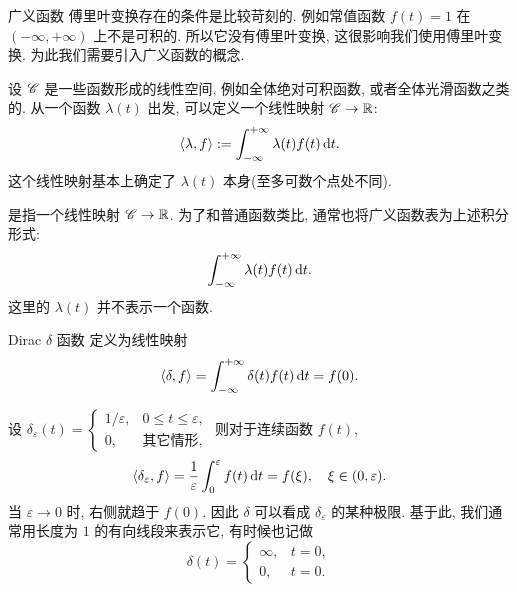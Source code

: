\begin{frame}{广义函数}
\onslide<+->
傅里叶变换存在的条件是比较苛刻的.
\onslide<+->
例如常值函数 $f(t)=1$ 在 $(-\infty,+\infty)$ 上不是可积的. 所以它没有傅里叶变换, 这很影响我们使用傅里叶变换.
\onslide<+->
为此我们需要引入广义函数的概念.

\onslide<+->
设 $\mathscr{C}$ 是一些函数形成的线性空间, 例如全体绝对可积函数, 或者全体光滑函数之类的. 
\onslide<+->
从一个函数 $\lambda(t)$ 出发, 可以定义一个线性映射 $\mathscr{C}\to {\mathbb{R}}$:
\[\langle{\lambda,f}\rangle:=\int_{-\infty}^{+\infty}\lambda(t)f(t)\,\mathrm{d} t.\]
\onslide<+->
这个线性映射基本上确定了 $\lambda(t)$ 本身(至多可数个点处不同).

\onslide<+->
是指一个线性映射 $\mathscr{C}\to {\mathbb{R}}$.
\onslide<+->
为了和普通函数类比, 通常也将广义函数表为上述积分形式:
\[\int_{-\infty}^{+\infty}\lambda(t)f(t)\,\mathrm{d} t.\]
这里的 $\lambda(t)$ 并不表示一个函数.
\end{frame}


\begin{frame}{Dirac $\delta$ 函数}
\onslide<+->
定义为线性映射
\[\langle{\delta,f}\rangle=\int_{-\infty}^{+\infty}\delta(t)f(t)\,\mathrm{d} t=f(0).\]
\onslide<+->
设 $\delta_\varepsilon(t)=\begin{cases}
1/\varepsilon,&0\le t\le \varepsilon,\\
0,&\text{其它情形,}
\end{cases}$
\onslide<+->
则对于连续函数 $f(t)$,
\[\langle{\delta_\varepsilon,f}\rangle=\frac1\varepsilon\int_0^\varepsilon f(t)\,\mathrm{d} t=f(\xi),\quad \xi\in(0,\varepsilon).\]
\onslide<+->
当 $\varepsilon\to0$ 时, 右侧就趋于 $f(0)$.
\onslide<+->
因此 $\delta$ 可以看成 $\delta_\varepsilon$ 的某种极限.
\onslide<+->
基于此, 我们通常用长度为 $1$ 的有向线段来表示它, 有时候也记做
\[\delta(t)=\begin{cases}
\infty,&t=0,\\
0,&t=0.
\end{cases}\]
\end{frame}


